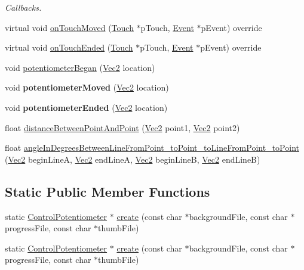\begin{DoxyCompactItemize}
\begin{DoxyCompactList}\small\item\em Callbacks. \end{DoxyCompactList}\item 
virtual void \hyperlink{classControlPotentiometer_a5da1557dea949b31c82c56ed7aef23eb}{on\+Touch\+Moved} (\hyperlink{classTouch}{Touch} $\ast$p\+Touch, \hyperlink{classEvent}{Event} $\ast$p\+Event) override
\item 
virtual void \hyperlink{classControlPotentiometer_adb487a04c463b3cfbf63be0957cee24c}{on\+Touch\+Ended} (\hyperlink{classTouch}{Touch} $\ast$p\+Touch, \hyperlink{classEvent}{Event} $\ast$p\+Event) override
\item 
void \hyperlink{classControlPotentiometer_a69e8c5d377472fd170890ae3690bb4de}{potentiometer\+Began} (\hyperlink{classVec2}{Vec2} location)
\item 
\mbox{\label{classControlPotentiometer_af9c282205e211f1ba0447158bfbf151e}} 
void {\bfseries potentiometer\+Moved} (\hyperlink{classVec2}{Vec2} location)
\item 
\mbox{\label{classControlPotentiometer_aac5c40fe78e249e162d17e19fdf974ef}} 
void {\bfseries potentiometer\+Ended} (\hyperlink{classVec2}{Vec2} location)
\item 
float \hyperlink{classControlPotentiometer_a4169e6c12a675aafd77d576acdaa837d}{distance\+Between\+Point\+And\+Point} (\hyperlink{classVec2}{Vec2} point1, \hyperlink{classVec2}{Vec2} point2)
\item 
float \hyperlink{classControlPotentiometer_a9662b2e1f7dcd8eca588a202bcf4709e}{angle\+In\+Degrees\+Between\+Line\+From\+Point\+\_\+to\+Point\+\_\+to\+Line\+From\+Point\+\_\+to\+Point} (\hyperlink{classVec2}{Vec2} begin\+LineA, \hyperlink{classVec2}{Vec2} end\+LineA, \hyperlink{classVec2}{Vec2} begin\+LineB, \hyperlink{classVec2}{Vec2} end\+LineB)
\end{DoxyCompactItemize}
\subsection*{Static Public Member Functions}
\begin{DoxyCompactItemize}
\item 
static \hyperlink{classControlPotentiometer}{Control\+Potentiometer} $\ast$ \hyperlink{classControlPotentiometer_a8abc77decaf67e3766d9ed6bf27b264d}{create} (const char $\ast$background\+File, const char $\ast$progress\+File, const char $\ast$thumb\+File)
\item 
static \hyperlink{classControlPotentiometer}{Control\+Potentiometer} $\ast$ \hyperlink{classControlPotentiometer_a32512b74b8516e0fbe8b7e9f9adfab33}{create} (const char $\ast$background\+File, const char $\ast$progress\+File, const char $\ast$thumb\+File)
\end{DoxyCompactItemize}
